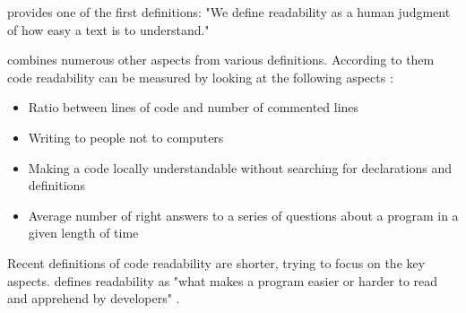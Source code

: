 \documentclass[%
class=scrreprt,
chapterprefix=false,%
open=right,%
twoside=false,%
paper=a4,%
logofile={Logo\_zentral\_farbig\_EN.png},%
thesistype=master,%
UKenglish,%
]{se2thesis}
\theoremstyle{definition}
\begin{document}

	
	\citeauthor{buse2009learning} provides one of the first definitions: "We define readability as a human judgment of how easy a
	text is to understand."

	\citeauthor{tashtoush2013impact} combines numerous other aspects from various definitions. According to them code readability can be measured by looking at the following aspects \cite{tashtoush2013impact}:
	\begin{itemize}
		\item Ratio between lines of code and number of commented lines
		\item Writing to people not to computers
		\item Making a code locally understandable without searching for declarations and definitions
		\item Average number of right answers to a series of questions about a program in a given length of time
	\end{itemize}
	
	Recent definitions of code readability are shorter, trying to focus on the key aspects. \citeauthor{oliveira2020evaluating} defines readability as "what makes a program easier or harder to read and apprehend by developers" \cite{oliveira2020evaluating}.
			
\end{document}
